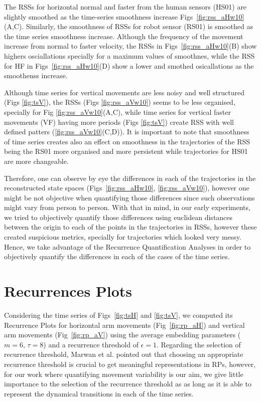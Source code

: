The RSSs for horizontal normal and faster from the human sensors (HS01)
are slightly smoothed as the time-series smoothness increase
Figs~\ref{fig:rss_aHw10}(A,C). Similarly, the smoothness of RSSs 
for robot sensor (RS01) is smoothed as the time series smoothness increase.
Although the frequency of the movement increase from normal to faster velocity, 
the RSSs in Figs~\ref{fig:rss_aHw10}(B)
show highers osciallations specially for a maximum values of smoothnes,
while the RSS for HF in Figs~\ref{fig:rss_aHw10}(D) show a lower and smothed
osicallations as the smoothenss increase.


Although time series for vertical movements are less noisy and well structured
(Figs \ref{fig:tsV}), the RSSs (Figs \ref{fig:rss_aVw10}) seems to be less 
organised, specially for Fig \ref{fig:rss_aVw10}(A,C), while time series 
for vertical faster movements (VF) having more periods (Figs \ref{fig:tsV})
create RSS with well defined patters (\ref{fig:rss_aVw10}(C,D)).
It is important to note that smoothness of time series creates also an effect
on smoothness in the trajectories of the RSS being the RS01 more organised
and more persistent while trajectories for HS01 are more changeable.

Therefore, one can observe by eye the differences in each of the trajectories 
in the reconstructed state spaces 
(Figs~\ref{fig:rss_aHw10}, \ref{fig:rss_aVw10}), 
however one might be not objective when quantifying 
those differences since such observations might vary from person to person.
With that in mind, in our early experiments, we tried to objectively 
quantify those differences using euclidean distances between the origin 
to each of the points in the trajectories in RSSs, however these created 
suspicious metrics, specially for trajectories which looked very messy.
Hence, we take advantage of the Recurrence Quantification Analyses
in order to objectively quantify the differences in each of the cases 
of the time series.



\section{Recurrences Plots}
Considering the time series of Figs~\ref{fig:tsH} and \ref{fig:tsV}, 
we computed its Recurrence Plots for horizontal arm movements 
(Fig~\ref{fig:rp_aH}) and vertical arm movements (Fig~\ref{fig:rp_aV}) 
using the average embedding parameters ($m=6$, $\tau=8$) and a recurrence 
threshold of $\epsilon=1$. Regarding the selection of recurrence threshold,
Marwan et al. \cite{marwan2011} pointed out that choosing an appropriate 
recurrence threshold is crucial to get meaningful representations in RPs, 
however, for our work where quantifying movement variability is our aim,
we give little importance to the selection of the recurrence threshold as
as long as it is able to represent the dynamical transitions in each of the 
time series.


